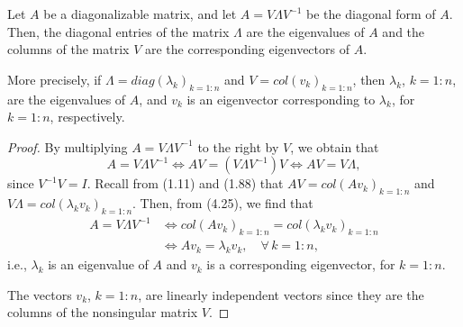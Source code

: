 \begin{theorem}
Let $A$ be a diagonalizable matrix, and let $A = V\Lambda V^{-1}$ be the diagonal form
of $A$. Then, the diagonal entries of the matrix $\Lambda$ are the eigenvalues of $A$
and the columns of the matrix $V$ are the corresponding eigenvectors of $A$.

More precisely, if $\Lambda = diag(\lambda_k)_{k=1:n}$ and $V = col(v_k)_{k=1:n}$,
then $\lambda_k$, $k = 1:n$, are the eigenvalues of $A$, and $v_k$ is an eigenvector
corresponding to $\lambda_k$, for $k = 1:n$, respectively.
\end{theorem}

\begin{proof}
By multiplying $A = V\Lambda V^{-1}$ to the right by $V$, we obtain that
\begin{equation}
A = V\Lambda V^{-1} \iff AV = (V\Lambda V^{-1})V \iff AV = V\Lambda,
\end{equation}
since $V^{-1}V = I$. Recall from (1.11) and (1.88) that $AV = col(Av_k)_{k=1:n}$ and
$V\Lambda = col(\lambda_k v_k)_{k=1:n}$. Then, from (4.25), we find that
\begin{align*}
A = V\Lambda V^{-1} &\iff col(Av_k)_{k=1:n} = col(\lambda_k v_k)_{k=1:n}\\
&\iff Av_k = \lambda_k v_k, \quad \forall\, k = 1:n,
\end{align*}
i.e., $\lambda_k$ is an eigenvalue of $A$ and $v_k$ is a corresponding eigenvector,
for $k = 1:n$.

The vectors $v_k$, $k = 1:n$, are linearly independent vectors since they are the
columns of the nonsingular matrix $V$.
\end{proof}
